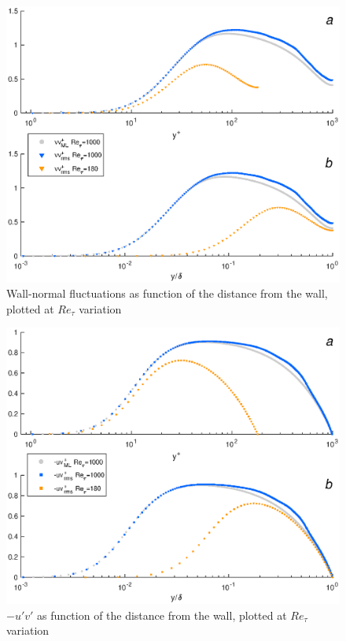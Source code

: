 \begin{figure}
\begin{center}
\includegraphics[scale=0.55]{grafici/vv_comparison}
\caption{Wall-normal fluctuations as function of the distance from the wall, plotted at $Re_{\tau}$ variation}
\label{vv:comparison}
\end{center}
\end{figure}

\begin{figure}
\begin{center}
\includegraphics[scale=0.55]{grafici/uv_comparison}
\caption{$-u'v'$ as function of the distance from the wall, plotted at $Re_{\tau}$ variation}
\label{uv:comparison}
\end{center}
\end{figure}

